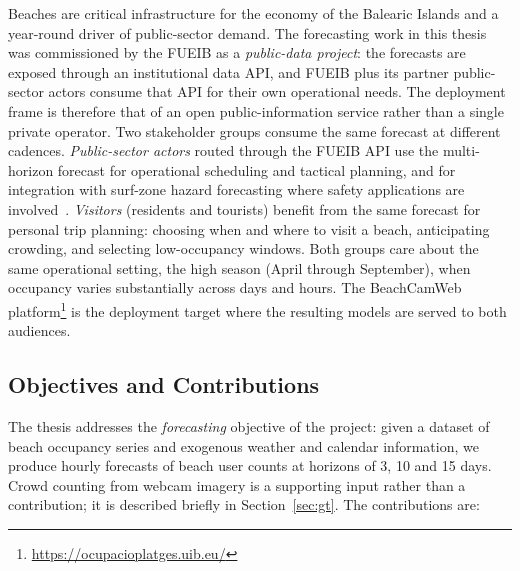 \documentclass[twocolumn,twoside,a4paper,10pt]{IEEEtran}
\begin{document}
Beaches are critical infrastructure for the economy of the Balearic Islands and a year-round driver of public-sector demand. The forecasting work in this thesis was commissioned by the FUEIB as a \emph{public-data project}: the forecasts are exposed through an institutional data API, and FUEIB plus its partner public-sector actors consume that API for their own operational needs. The deployment frame is therefore that of an open public-information service rather than a single private operator. Two stakeholder groups consume the same forecast at different cadences. \emph{Public-sector actors} routed through the FUEIB API use the multi-horizon forecast for operational scheduling and tactical planning, and for integration with surf-zone hazard forecasting where safety applications are involved~\cite{Castelle2025}. \emph{Visitors} (residents and tourists) benefit from the same forecast for personal trip planning: choosing when and where to visit a beach, anticipating crowding, and selecting low-occupancy windows. Both groups care about the same operational setting, the high season (April through September), when occupancy varies substantially across days and hours. The BeachCamWeb platform\footnote{\url{https://ocupacioplatges.uib.eu/}} is the deployment target where the resulting models are served to both audiences.

\subsection{Objectives and Contributions}

The thesis addresses the \emph{forecasting} objective of the project: given a dataset of beach occupancy series and exogenous weather and calendar information, we produce hourly forecasts of beach user counts at horizons of 3, 10 and 15 days. Crowd counting from webcam imagery is a supporting input rather than a contribution; it is described briefly in Section~\ref{sec:gt}. The contributions are:
\end{document}
